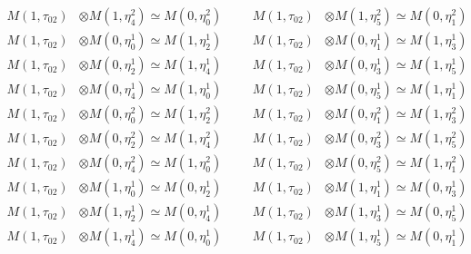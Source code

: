 \begin{align*}
M(1,\tau_{02}) &\otimes M(1,\eta^{2}_{4}) \simeq M(0,\eta^{2}_{0}) &&& M(1,\tau_{02}) &\otimes M(1,\eta^{2}_{5}) \simeq M(0,\eta^{2}_{1})\\
M(1,\tau_{02}) &\otimes M(0,\eta^{1}_{0}) \simeq M(1,\eta^{1}_{2}) &&& M(1,\tau_{02}) &\otimes M(0,\eta^{1}_{1}) \simeq M(1,\eta^{1}_{3})\\
M(1,\tau_{02}) &\otimes M(0,\eta^{1}_{2}) \simeq M(1,\eta^{1}_{4}) &&& M(1,\tau_{02}) &\otimes M(0,\eta^{1}_{3}) \simeq M(1,\eta^{1}_{5})\\
M(1,\tau_{02}) &\otimes M(0,\eta^{1}_{4}) \simeq M(1,\eta^{1}_{0}) &&& M(1,\tau_{02}) &\otimes M(0,\eta^{1}_{5}) \simeq M(1,\eta^{1}_{1})\\
M(1,\tau_{02}) &\otimes M(0,\eta^{2}_{0}) \simeq M(1,\eta^{2}_{2}) &&& M(1,\tau_{02}) &\otimes M(0,\eta^{2}_{1}) \simeq M(1,\eta^{2}_{3})\\
M(1,\tau_{02}) &\otimes M(0,\eta^{2}_{2}) \simeq M(1,\eta^{2}_{4}) &&& M(1,\tau_{02}) &\otimes M(0,\eta^{2}_{3}) \simeq M(1,\eta^{2}_{5})\\
M(1,\tau_{02}) &\otimes M(0,\eta^{2}_{4}) \simeq M(1,\eta^{2}_{0}) &&& M(1,\tau_{02}) &\otimes M(0,\eta^{2}_{5}) \simeq M(1,\eta^{2}_{1})\\
M(1,\tau_{02}) &\otimes M(1,\eta^{1}_{0}) \simeq M(0,\eta^{1}_{2}) &&& M(1,\tau_{02}) &\otimes M(1,\eta^{1}_{1}) \simeq M(0,\eta^{1}_{3})\\
M(1,\tau_{02}) &\otimes M(1,\eta^{1}_{2}) \simeq M(0,\eta^{1}_{4}) &&& M(1,\tau_{02}) &\otimes M(1,\eta^{1}_{3}) \simeq M(0,\eta^{1}_{5})\\
M(1,\tau_{02}) &\otimes M(1,\eta^{1}_{4}) \simeq M(0,\eta^{1}_{0}) &&& M(1,\tau_{02}) &\otimes M(1,\eta^{1}_{5}) \simeq M(0,\eta^{1}_{1})\\
\end{align*}

